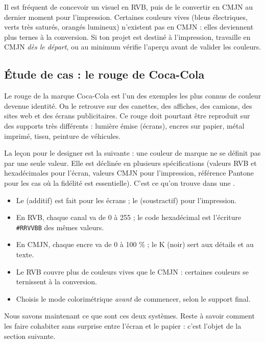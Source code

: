 \begin{erreur}
Il est fréquent de concevoir un visuel en RVB, puis de le convertir en CMJN au dernier moment pour l'impression. Certaines couleurs vives (bleus électriques, verts très saturés, orangés lumineux) n'existent pas en CMJN : elles deviennent plus ternes à la conversion. Si ton projet est destiné à l'impression, travaille en CMJN \emph{dès le départ}, ou au minimum vérifie l'aperçu avant de valider les couleurs.
\end{erreur}

\subsection{Étude de cas : le rouge de Coca-Cola}

Le rouge de la marque Coca-Cola est l'un des exemples les plus connus de couleur devenue identité. On le retrouve sur des canettes, des affiches, des camions, des sites web et des écrans publicitaires. Ce rouge doit pourtant être reproduit sur des supports très différents : lumière émise (écrans), encres sur papier, métal imprimé, tissu, peinture de véhicules.

La leçon pour le designer est la suivante : une couleur de marque ne se définit pas par une seule valeur. Elle est déclinée en plusieurs spécifications (valeurs RVB et hexadécimales pour l'écran, valeurs CMJN pour l'impression, référence Pantone pour les cas où la fidélité est essentielle). C'est ce qu'on trouve dans une .

\begin{retenir}
\begin{itemize}
  \item Le  (additif) est fait pour les écrans ; le  (soustractif) pour l'impression.
  \item En RVB, chaque canal va de 0 à 255 ; le code hexadécimal est l'écriture \texttt{\#RRVVBB} des mêmes valeurs.
  \item En CMJN, chaque encre va de 0 à 100 \% ; le K (noir) sert aux détails et au texte.
  \item Le RVB couvre plus de couleurs vives que le CMJN : certaines couleurs se ternissent à la conversion.
  \item Choisis le mode colorimétrique \emph{avant} de commencer, selon le support final.
\end{itemize}
\end{retenir}

Nous savons maintenant ce que sont ces deux systèmes. Reste à savoir comment les faire cohabiter sans surprise entre l'écran et le papier : c'est l'objet de la section suivante.

